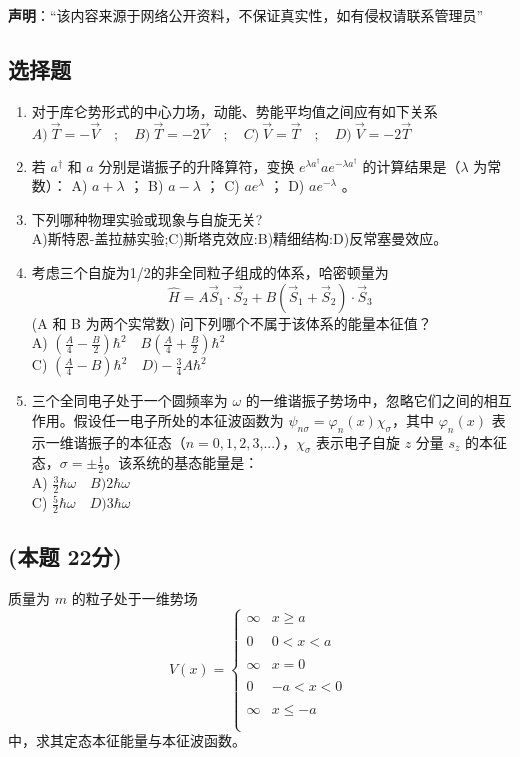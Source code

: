
\textbf{声明}：“该内容来源于网络公开资料，不保证真实性，如有侵权请联系管理员”

\subsection{选择题}
\begin{enumerate}
\item 对于库仑势形式的中心力场，动能、势能平均值之间应有如下关系
$A) \ \vec{T} = -\vec{V} \quad ; \quad B) \ \vec{T} = -2\vec{V} \quad ; \quad 
C) \ \vec{V} = \vec{T} \quad ; \quad D) \ \vec{V} = -2\vec{T} $
\item 若 $a^{\dagger}$ 和 $a$ 分别是谐振子的升降算符，变换 $e^{\lambda a^{\dagger}} a e^{-\lambda a^{\dagger}}$ 的计算结果是（$\lambda$ 为常数）：
A) $a + \lambda$ ； B) $a - \lambda$ ； C) $a e^{\lambda}$ ； D) $a e^{-\lambda}$ 。
\item 下列哪种物理实验或现象与自旋无关?\\
A)斯特恩-盖拉赫实验;C)斯塔克效应:B)精细结构:D)反常塞曼效应。
\item 考虑三个自旋为1/2的非全同粒子组成的体系，哈密顿量为
$$\hat{H} = A \vec{S}_1 \cdot \vec{S}_2 + B (\vec{S}_1 + \vec{S}_2) \cdot \vec{S}_3~$$(A 和 B 为两个实常数)
问下列哪个不属于该体系的能量本征值？\\
A) $\left(\frac{A}{4} - \frac{B}{2}\right)\hbar^2 \quad B \left(\frac{A}{4} + \frac{B}{2}\right)\hbar^2$\\
C) $\left(\frac{A}{4} - B\right)\hbar^2 \quad D)  -\frac{3}{4}A \hbar^2$
\item 三个全同电子处于一个圆频率为 $\omega$ 的一维谐振子势场中，忽略它们之间的相互作用。假设任一电子所处的本征波函数为 $\psi_{n\sigma }= \varphi_{n}(x) \chi_{\sigma}$，其中 $\varphi_{n}(x)$ 表示一维谐振子的本征态（$n = 0,1,2,3$,...），$\chi_{\sigma}$ 表示电子自旋 $z$ 分量 $s_z$ 的本征态，$\sigma = \pm \frac{1}{2}$。该系统的基态能量是：\\
A) $\frac{3}{2}\hbar\omega \quad B)2\hbar\omega$\\
C) $\frac{5}{2}\hbar\omega \quad D) 3\hbar\omega$
\end{enumerate}
\subsection{(本题 22分)}
质量为 $m$ 的粒子处于一维势场
$$V(x) = \begin{cases} \infty & x \geq a \\\\0 & 0 < x < a \\\\\infty & x = 0 \\\\0&-a < x < 0 \\\\\infty & x \leq -a \\\\\ \end{cases}~$$
中，求其定态本征能量与本征波函数。
